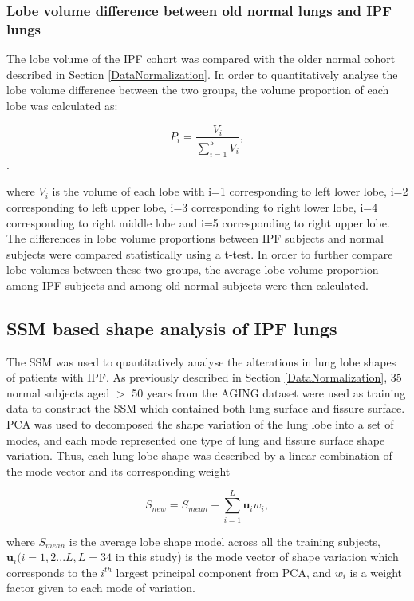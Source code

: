 \subsubsection{Lobe volume difference between old normal lungs and IPF lungs}
The lobe volume of the IPF cohort was compared with the older normal cohort described in Section \ref{DataNormalization}. In order to quantitatively analyse the lobe volume difference between the two groups, the volume proportion of each lobe was calculated as:

\begin{equation}
 \label{eq:FissurePrediction1}
 P_{i} = \frac{V_{i}}{\sum_{i=1}^{5}V_i},
\end{equation}. 

\noindent where $V_{i}$ is the volume of each lobe with i=1 corresponding to left lower lobe, i=2 corresponding to left upper lobe, i=3 corresponding to right lower lobe, i=4 corresponding to right middle lobe and i=5 corresponding to right upper lobe. The differences in lobe volume proportions between IPF subjects and normal subjects were compared statistically using a t-test. In order to further compare lobe volumes between these two groups, the average lobe volume proportion among IPF subjects and among old normal subjects were then calculated.

\subsection{SSM based shape analysis of IPF lungs} \label{SSMBasedAnalysis}
The SSM was used to quantitatively analyse the alterations in lung lobe shapes of patients with IPF. As previously described in Section \ref{DataNormalization}, 35 normal subjects aged $>$ 50 years from the AGING dataset were used as training data to construct the SSM which contained both lung surface and fissure surface. PCA was used to decomposed the shape variation of the lung lobe into a set of modes, and each mode represented one type of lung and fissure surface shape variation. Thus, each lung lobe shape was described by a linear combination of the mode vector and its corresponding weight

\begin{equation}
 \label{eq:FissurePrediction1}
 S_{new} = S_{mean} + \sum_{i=1}^L \mathbf{u}_i w_{i},
\end{equation}

\noindent where $S_{mean}$ is the average lobe shape model across all the training subjects, $\mathbf{u}_i (i = 1,2...L, L=34$ in this study) is the mode vector of shape variation which corresponds to the $i^{th}$ largest principal component from PCA, and $w_{i}$ is a weight factor given to each mode of variation. 


